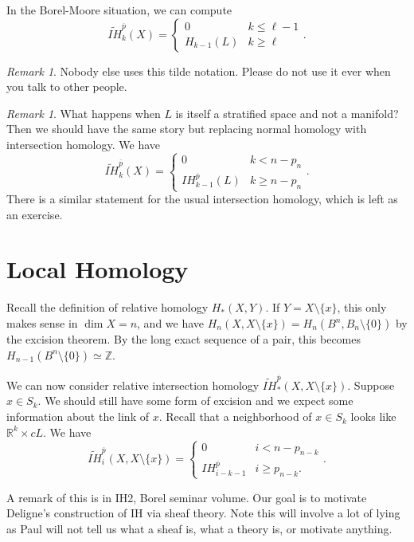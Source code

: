 \documentclass[leqno, openany]{memoir}
\theoremstyle{definition}
\theoremstyle{remark}
\newtheorem{rmk}[thm]{Remark}
\theoremstyle{plain}
\theoremstyle{definition}
\theoremstyle{remark}
\newcommand{\R}{\mathbb{R}}
\newcommand{\Z}{\mathbb{Z}}
\begin{document}
In the Borel-Moore situation, we can compute
\[ \widetilde{IH}_k^{\overline{p}}(X) = \begin{cases}
    0 & k \leq \ell - 1 \\
    H_{k-1}(L) & k \geq \ell
\end{cases}. \]
\begin{rmk}
    Nobody else uses this tilde notation. Please do not use it ever when you talk to other people.
\end{rmk}

\begin{rmk}
    What happens when $L$ is itself a stratified space and not a manifold? Then we should have the same story but replacing normal homology with intersection homology. We have
    \[ \widetilde{IH}_k^{\overline{p}}(X) = \begin{cases}
        0 & k < n - p_n \\
        IH_{k-1}^{\overline{p}}(L) & k \geq n - p_n
    \end{cases}. \]
    There is a similar statement for the usual intersection homology, which is left as an exercise.
\end{rmk}

\section{Local Homology}%
\label{sec:local_homology}

Recall the definition of relative homology $H_*(X,Y)$. If $Y = X \setminus \{ x \}$, this only makes sense in $\dim X = n$, and we have $H_n(X, X \setminus \{x\}) = H_n(B^n, B_n \setminus \{0\})$ by the excision theorem. By the long exact sequence of a pair, this becomes $H_{n-1}(B^n \setminus \{0\}) \simeq \Z$. 

We can now consider relative intersection homology $\widetilde{IH}_*^{\overline{p}}(X, X \setminus \{ x \})$. Suppose $x \in S_k$. We should still have some form of excision and we expect some information about the link of $x$. Recall that a neighborhood of $x \in S_k$ looks like $\R^k \times cL$. We have
\[ \widetilde{IH}_i^{\overline{p}}(X, X \setminus \{x \}) = \begin{cases}
    0 & i < n - p_{n-k} \\
    IH_{i-k-1}^{\overline{p}} & i \geq p_{n-k}.
\end{cases}. \]

A remark of this is in IH2, Borel seminar volume. Our goal is to motivate Deligne's construction of IH via sheaf theory. Note this will involve a lot of lying as Paul will not tell us what a sheaf is, what a theory is, or motivate anything.
\end{document}
